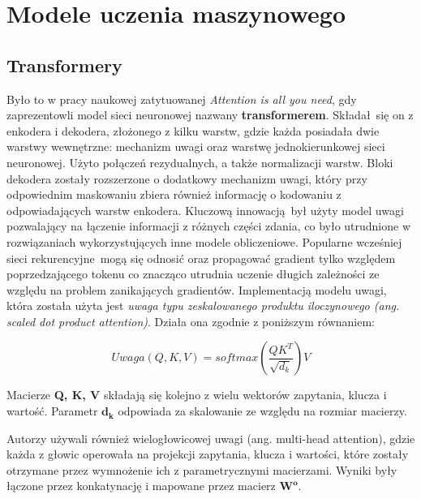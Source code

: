 \section{Modele uczenia maszynowego}


\subsection{Transformery}

Było to w pracy naukowej zatytuowanej \emph{Attention is all you need}, gdy \cite{vaswani2017attention} zaprezentowli model sieci neuronowej nazwany \textbf{transformerem}. Składał się on z enkodera i dekodera, złożonego z kilku warstw, gdzie każda posiadała dwie warstwy wewnętrzne: mechanizm uwagi oraz warstwę jednokierunkowej sieci neuronowej. Użyto połączeń rezydualnych, a także normalizacji warstw. Bloki dekodera zostały rozszerzone o dodatkowy mechanizm uwagi, który przy odpowiednim maskowaniu zbiera również informację o kodowaniu z odpowiadających warstw enkodera. Kluczową innowacją był użyty model uwagi pozwalający na łączenie informacji z różnych części zdania, co było utrudnione w rozwiązaniach wykorzystujących inne modele obliczeniowe. Popularne wcześniej sieci rekurencyjne mogą się odnosić oraz propagować gradient tylko względem poprzedzającego tokenu co znacząco utrudnia uczenie długich zależności ze względu na problem zanikających gradientów. Implementacją modelu uwagi, która została użyta jest \emph{uwaga typu zeskalowanego produktu iloczynowego (ang. scaled dot product attention)}. Działa ona zgodnie z poniższym równaniem: 

\begin{equation}
Uwaga(Q, K, V) = softmax(\frac{QK^T}{\sqrt{d_k}}) V
\end{equation}

Macierze \textbf{Q, K, V} składają się kolejno z wielu wektorów zapytania, klucza i wartość. Parametr $\mathbf{d_k}$ odpowiada za skalowanie ze względu na rozmiar macierzy.\newline 

Autorzy używali również wielogłowicowej uwagi (ang. multi-head attention), gdzie każda z głowic operowała na projekcji zapytania, klucza i wartości, które zostały otrzymane przez wymnożenie ich z parametrycznymi macierzami. Wyniki były łączone przez konkatynację i mapowane przez macierz $\mathbf{W^o}$.\newline

